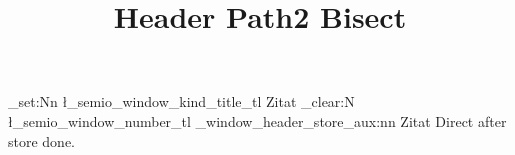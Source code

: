 \documentclass[type=zwischenbericht]{zukunftbau}
\title{Header Path2 Bisect}
\begin{document}
\ExplSyntaxOn
\tl_set:Nn \l_semio_window_kind_title_tl { Zitat }
\tl_clear:N \l_semio_window_number_tl
\semio_window_header_store_aux:nn { } { Zitat }
\ExplSyntaxOff
\makeatletter
\semio@window@header@invoke
\makeatother
Direct after store done.
\end{document}
